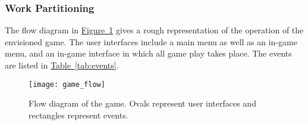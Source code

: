 \documentclass[12pt, titlepage]{article}
\begin{document}
\subsubsection{Work Partitioning}
The flow diagram in \hyperref[fig:gameflow]{Figure~\ref*{fig:gameflow}} gives a rough representation of the operation of the envisioned game.  The user interfaces include a main menu as well as an in-game menu, and an in-game interface in which all game play takes place.  The events are listed in \hyperref[tab:events]{Table~\ref*{tab:events}}.
\begin{figure}
\texttt{[image: game\_flow]}
\caption[Flow diagram of the game]{Flow diagram of the game.  Ovals represent user interfaces and rectangles represent events.} \label{fig:gameflow}
\end{figure}
\end{document}
